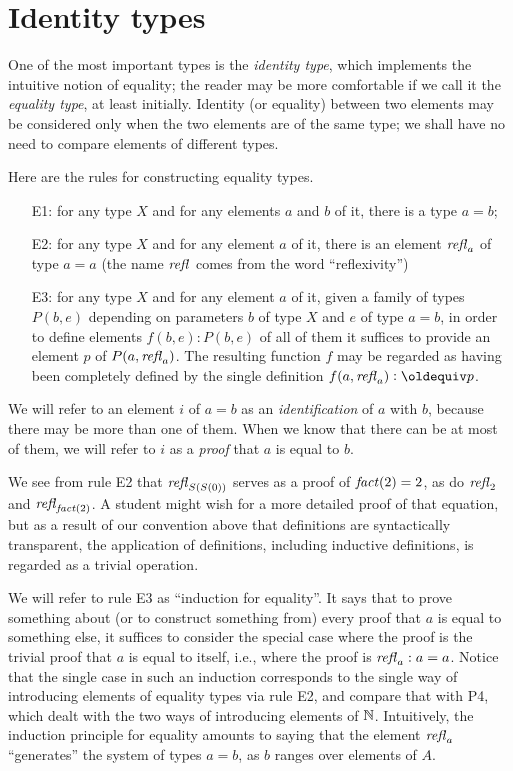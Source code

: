 \section{Identity types}
\label{sec:identity-types}

One of the most important types is the \emph{identity type}, which implements the intuitive notion of equality; the reader may be more
comfortable if we call it the \emph{equality type}, at least initially.  Identity (or equality) between two elements may be considered only when
the two elements are of the same type; we shall have no need to compare elements of different types.

Here are the rules for constructing equality types.
\begin{enumerate}
\item[E1:]
  for any type $X$ and for any elements $a$ and $b$ of it, there is a type $a=b$;
\item[E2:] for any type $X$ and for any element $a$ of it, there is an element $\mathop{{\it refl}_{a}}$ of type $a=a$ (the name $\mathop{{\it refl}_{}}$ comes from the word
  ``reflexivity'')
\item[E3:] for any type $X$ and for any element $a$ of it, given a family of types $P(b,e)$ depending on parameters $b$ of type $X$ and $e$ of type
  $a=b$, in order to define elements $f(b,e) : P(b,e)$ of all of them it suffices to provide an element $p$ of $P(a,\mathop{{\it refl}_{a}})$.  The resulting
  function $f$ may be regarded as having been completely defined by the single definition $f(a,\refl a) \defeq p$.
\end{enumerate}

We will refer to an element $i$ of $a=b$ as an {\em identification} of $a$ with $b$, because there may be more than one of them.  When we know
that there can be at most of them, we will refer to $i$ as a {\em proof} that $a$ is equal to $b$.

We see from rule E2 that $\mathop{{\it refl}_{S(S(0))}}$ serves as a proof of $\mathop{\mathit{fact}}(2)=2$, 
as do $\mathop{{\it refl}_{2}}$ and $\mathop{{\it refl}_{\mathop{\mathit{fact}}(2)}}$.  A student might wish for a
more detailed proof of that equation, but as a result of our convention above that definitions are syntactically transparent, the application of
definitions, including inductive definitions, is regarded as a trivial operation.

We will refer to rule E3 as ``induction for equality''.  It says that to prove something about (or to construct something from) every proof that
$a$ is equal to something else, it suffices to consider the special case where the proof is the trivial proof that $a$ is equal to itself, i.e.,
where the proof is $\mathop{{\it refl}_{a}} : a=a$.  Notice that the single case in such an induction corresponds to the single way of introducing elements of
equality types via rule E2, and compare that with P4, which dealt with the two ways of introducing elements of $\mathbb{N}$.
Intuitively, the induction principle for equality amounts to saying that the element $\mathop{{\it refl}_{a}}$ ``generates'' the system of types $a=b$, as $b$
ranges over elements of $A$.

